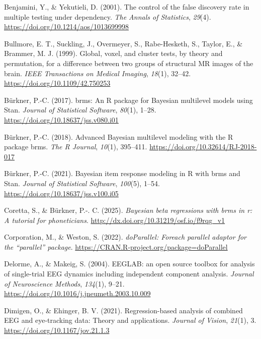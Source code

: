 \documentclass[
  doc,
  floatsintext,
  longtable,
  a4paper,
  nolmodern,
  notxfonts,
  notimes,
  donotrepeattitle,
  colorlinks=true,linkcolor=blue,citecolor=blue,urlcolor=blue]{apa7}
\newlength{\cslhangindent}
\newenvironment{CSLReferences}[2] %
 {\begin{list}{}{%
  \setlength{\itemindent}{0pt}
  \setlength{\leftmargin}{0pt}
  \setlength{\parsep}{0pt}
  \ifodd #1
   \setlength{\leftmargin}{\cslhangindent}
   \setlength{\itemindent}{-1\cslhangindent}
  \fi
  \setlength{\itemsep}{#2\baselineskip}}}
 {\end{list}}
\begin{document}
\begin{CSLReferences}{1}{0}
Benjamini, Y., \& Yekutieli, D. (2001). The control of the false
discovery rate in multiple testing under dependency. \emph{The Annals of
Statistics}, \emph{29}(4). \url{https://doi.org/10.1214/aos/1013699998}

Bullmore, E. T., Suckling, J., Overmeyer, S., Rabe-Hesketh, S., Taylor,
E., \& Brammer, M. J. (1999). Global, voxel, and cluster tests, by
theory and permutation, for a difference between two groups of
structural MR images of the brain. \emph{IEEE Transactions on Medical
Imaging}, \emph{18}(1), 32--42. \url{https://doi.org/10.1109/42.750253}

Bürkner, P.-C. (2017). {brms}: An {R} package for {Bayesian} multilevel
models using {Stan}. \emph{Journal of Statistical Software},
\emph{80}(1), 1--28. \url{https://doi.org/10.18637/jss.v080.i01}

Bürkner, P.-C. (2018). Advanced {Bayesian} multilevel modeling with the
{R} package {brms}. \emph{The R Journal}, \emph{10}(1), 395--411.
\url{https://doi.org/10.32614/RJ-2018-017}

Bürkner, P.-C. (2021). Bayesian item response modeling in {R} with
{brms} and {Stan}. \emph{Journal of Statistical Software},
\emph{100}(5), 1--54. \url{https://doi.org/10.18637/jss.v100.i05}

Coretta, S., \& Bürkner, P.-. C. (2025). \emph{Bayesian beta regressions
with brms in r: A tutorial for phoneticians}.
\url{http://dx.doi.org/10.31219/osf.io/f9rqg_v1}

Corporation, M., \& Weston, S. (2022). \emph{{doParallel}: Foreach
parallel adaptor for the {``{parallel}''} package}.
\url{https://CRAN.R-project.org/package=doParallel}

Delorme, A., \& Makeig, S. (2004). EEGLAB: an open source toolbox for
analysis of single-trial EEG dynamics including independent component
analysis. \emph{Journal of Neuroscience Methods}, \emph{134}(1), 9--21.
\url{https://doi.org/10.1016/j.jneumeth.2003.10.009}

Dimigen, O., \& Ehinger, B. V. (2021). Regression-based analysis of
combined EEG and eye-tracking data: Theory and applications.
\emph{Journal of Vision}, \emph{21}(1), 3.
\url{https://doi.org/10.1167/jov.21.1.3}


\end{CSLReferences}
\end{document}
